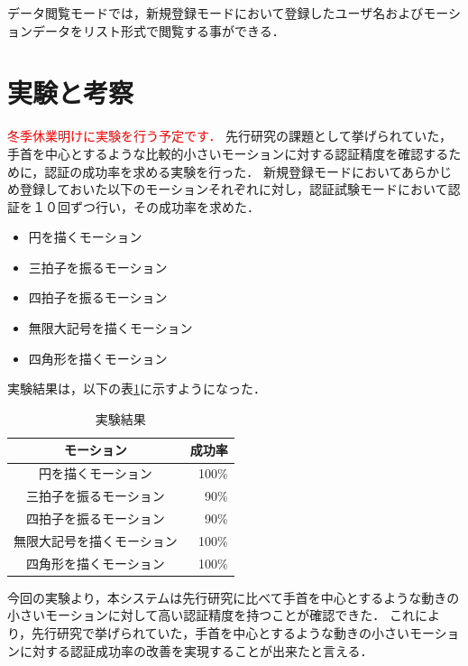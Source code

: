 \documentclass[11pt]{jarticle}
\begin{document}
データ閲覧モードでは，新規登録モードにおいて登録したユーザ名およびモーションデータをリスト形式で閲覧する事ができる．

\section{実験と考察}
\textcolor{red}{冬季休業明けに実験を行う予定です．}
先行研究の課題として挙げられていた，手首を中心とするような比較的小さいモーションに対する認証精度を確認するために，認証の成功率を求める実験を行った．
新規登録モードにおいてあらかじめ登録しておいた以下のモーションそれぞれに対し，認証試験モードにおいて認証を１０回ずつ行い，その成功率を求めた．

\begin{itemize}
    \item 円を描くモーション
    \item 三拍子を振るモーション
    \item 四拍子を振るモーション
    \item 無限大記号を描くモーション
    \item 四角形を描くモーション
\end{itemize}

実験結果は，以下の表\ref{result}に示すようになった．

\begin{table}[htb]
    \begin{center}
        \caption{実験結果}
        \label{result}
        \begin{tabular}{|c|r|} \hline
            モーション & 成功率 \\ \hline \hline
            円を描くモーション & 100\% \\ \hline
            三拍子を振るモーション & 90\% \\ \hline
            四拍子を振るモーション & 90\% \\ \hline
            無限大記号を描くモーション & 100\% \\ \hline
            四角形を描くモーション & 100\% \\ \hline
        \end{tabular}
    \end{center}
\end{table}

今回の実験より，本システムは先行研究に比べて手首を中心とするような動きの小さいモーションに対して高い認証精度を持つことが確認できた．
これにより，先行研究で挙げられていた，手首を中心とするような動きの小さいモーションに対する認証成功率の改善を実現することが出来たと言える．
\end{document}
